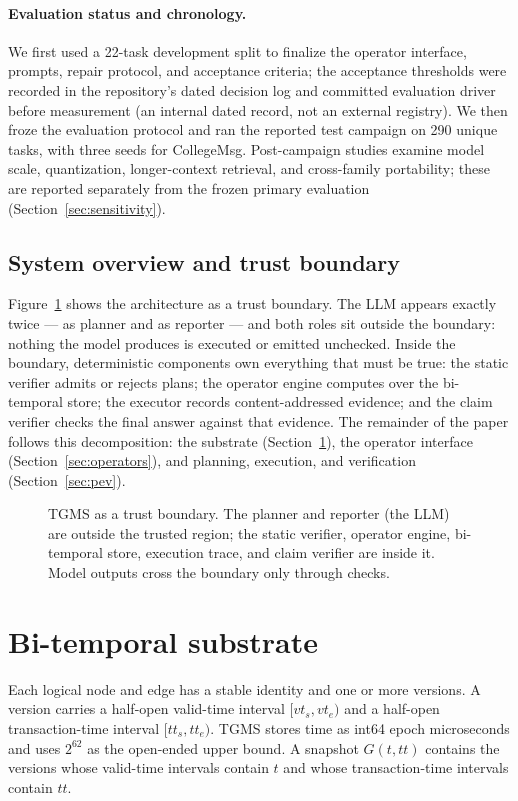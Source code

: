 \documentclass[11pt]{article}
\begin{document}
\paragraph{Evaluation status and chronology.}
We first used a 22-task development split to finalize the operator
interface, prompts, repair protocol, and acceptance criteria; the
acceptance thresholds were recorded in the repository's dated decision
log and committed evaluation driver before measurement (an internal
dated record, not an external registry). We then froze the evaluation
protocol and ran the reported test campaign on 290 unique tasks, with
three seeds for CollegeMsg. Post-campaign studies examine model scale,
quantization, longer-context retrieval, and cross-family portability;
these are reported separately from the frozen primary evaluation
(Section~\ref{sec:sensitivity}).

\subsection{System overview and trust boundary}
Figure~\ref{fig:arch} shows the architecture as a trust boundary. The
LLM appears exactly twice --- as planner and as reporter --- and both
roles sit outside the boundary: nothing the model produces is executed
or emitted unchecked. Inside the boundary, deterministic components own
everything that must be true: the static verifier admits or rejects
plans; the operator engine computes over the bi-temporal store; the
executor records content-addressed evidence; and the claim verifier
checks the final answer against that evidence. The remainder of the
paper follows this decomposition: the substrate
(Section~\ref{sec:substrate}), the operator interface
(Section~\ref{sec:operators}), and planning, execution, and
verification (Section~\ref{sec:pev}).

\begin{figure}[t]
\centering
\resizebox{\textwidth}{!}{}
\caption{TGMS as a trust boundary. The planner and reporter (the LLM)
are outside the trusted region; the static verifier, operator engine,
bi-temporal store, execution trace, and claim verifier are inside it.
Model outputs cross the boundary only through checks.}
\label{fig:arch}
\end{figure}

\section{Bi-temporal substrate}
\label{sec:substrate}
Each logical node and edge has a stable identity and one or more
versions. A version carries a half-open valid-time interval
$[vt_s, vt_e)$ and a half-open transaction-time interval $[tt_s, tt_e)$.
TGMS stores time as int64 epoch microseconds and uses $2^{62}$ as the
open-ended upper bound. A snapshot $G(t,tt)$ contains the versions whose
valid-time intervals contain $t$ and whose transaction-time intervals
contain $tt$.
\end{document}

